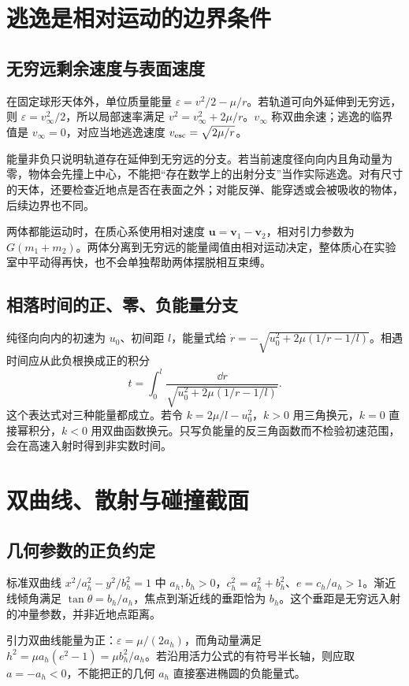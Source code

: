 \section{逃逸是相对运动的边界条件}
\subsection{无穷远剩余速度与表面速度}

在固定球形天体外，单位质量能量 $\varepsilon=v^2/2-\mu/r$。若轨道可向外延伸到无穷远，则 $\varepsilon=v_\infty^2/2$，所以局部速率满足 $v^2=v_\infty^2+2\mu/r$。$v_\infty$ 称双曲余速；逃逸的临界值是 $v_\infty=0$，对应当地逃逸速度 $v_{\rm esc}=\sqrt{2\mu/r}$。

能量非负只说明轨道存在延伸到无穷远的分支。若当前速度径向向内且角动量为零，物体会先撞上中心，不能把“存在数学上的出射分支”当作实际逃逸。对有尺寸的天体，还要检查近地点是否在表面之外；对能反弹、能穿透或会被吸收的物体，后续边界也不同。

两体都能运动时，在质心系使用相对速度 $\bm u=\bm v_1-\bm v_2$，相对引力参数为 $G(m_1+m_2)$。两体分离到无穷远的能量阈值由相对运动决定，整体质心在实验室中平动得再快，也不会单独帮助两体摆脱相互束缚。

\subsection{相落时间的正、零、负能量分支}

纯径向向内的初速为 $u_0$、初间距 $l$，能量式给 $\dot r=-\sqrt{u_0^2+2\mu(1/r-1/l)}$。相遇时间应从此负根换成正的积分
\[t=\int_0^l\frac{\dd r}{\sqrt{u_0^2+2\mu(1/r-1/l)}}.\]
这个表达式对三种能量都成立。若令 $k=2\mu/l-u_0^2$，$k>0$ 用三角换元，$k=0$ 直接幂积分，$k<0$ 用双曲函数换元。只写负能量的反三角函数而不检验初速范围，会在高速入射时得到非实数时间。


\section{双曲线、散射与碰撞截面}
\subsection{几何参数的正负约定}

标准双曲线 $x^2/a_h^2-y^2/b_h^2=1$ 中 $a_h,b_h>0$，$c_h^2=a_h^2+b_h^2$、$e=c_h/a_h>1$。渐近线倾角满足 $\tan\theta=b_h/a_h$，焦点到渐近线的垂距恰为 $b_h$。这个垂距是无穷远入射的冲量参数，并非近地点距离。

引力双曲线能量为正：$\varepsilon=\mu/(2a_h)$，而角动量满足 $h^2=\mu a_h(e^2-1)=\mu b_h^2/a_h$。若沿用活力公式的有符号半长轴，则应取 $a=-a_h<0$，不能把正的几何 $a_h$ 直接塞进椭圆的负能量式。

